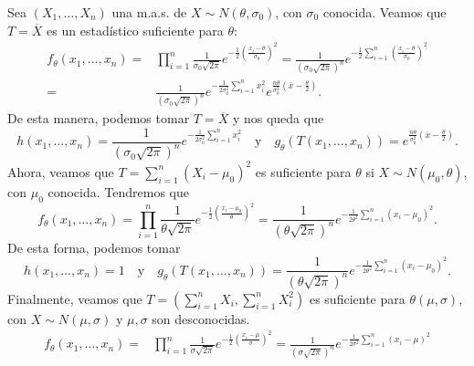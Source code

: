\begin{eg}[Normal]
	Sea $\displaystyle \left(X_{1}, \ldots, X_{n}\right) $ una m.a.s. de $\displaystyle X\sim N\left(\theta, \sigma_{0}\right) $, con $\displaystyle \sigma_{0} $ conocida. Veamos que $\displaystyle T=\overline{X} $ es un estadístico suficiente para $\displaystyle \theta $:
	\[
	\begin{split}
		f_{\theta}\left(x_{1}, \ldots, x_{n}\right)= & \prod^{n}_{i=1}\frac{1}{\sigma_{0}\sqrt{2\pi }}e^{-\frac{1}{2}\left(\frac{x_{i}-\theta}{\sigma_{0}}\right)^{2}}=\frac{1}{\left(\sigma_{0}\sqrt{2\pi }\right)^{n}} e^{-\frac{1}{2}\sum^{n}_{i=1}\left(\frac{x_{i}-\theta}{\sigma_{0}}\right)^{2}}\\
		= &\frac{1}{\left(\sigma_{0}\sqrt{2\pi }\right)^{n}} e^{-\frac{1}{2\sigma_{0}^{2}}\sum^{n}_{i=1}x_{i}^{2}}e^{\frac{n\theta}{\sigma_{0}^{2}}\left(\overline{x}-\frac{\theta}{2}\right)}.
	\end{split}
	\]
De esta manera, podemos tomar $\displaystyle T = \overline{X} $ y nos queda que
\[h\left(x_{1}, \ldots, x_{n}\right)=\frac{1}{\left(\sigma_{0}\sqrt{2\pi }\right)^{n}}e^{-\frac{1}{2\sigma_{0}^{2}}\sum^{n}_{i=1}x_{i}^{2}} \quad \text{y} \quad g_{\theta}\left(T\left(x_{1}, \ldots, x_{n}\right)\right)= e^{\frac{n\theta}{\sigma_{0}^{2}}\left(\overline{x}-\frac{\theta}{2}\right)}.\]
Ahora, veamos que $\displaystyle T = \sum^{n}_{i=1}\left(X_{i}-\mu_{0}\right)^{2} $ es suficiente para $\displaystyle \theta $ si $\displaystyle X \sim N\left(\mu_{0}, \theta\right) $, con $\displaystyle \mu_{0} $ conocida. Tendremos que
\[f_{\theta}\left(x_{1}, \ldots, x_{n}\right)=\prod^{n}_{i=1}\frac{1}{\theta\sqrt{2\pi }}e^{-\frac{1}{2}\left(\frac{x_{i}-\mu_{0}}{\theta}\right)^{2}}=\frac{1}{\left(\theta\sqrt{2\pi }\right)^{n}}e^{-\frac{1}{2\theta^{2}}\sum^{n}_{i=1}\left(x_{i}-\mu_{0}\right)^{2}} .\]
De esta forma, podemos tomar
\[h\left(x_{1}, \ldots, x_{n}\right)=1 \quad \text{y} \quad g_{\theta}\left(T\left(x_{1}, \ldots, x_{n}\right)\right)=\frac{1}{\left(\theta\sqrt{2\pi }\right)^{n}}e^{-\frac{1}{2\theta^{2}}\sum^{n}_{i=1}\left(x_{i}-\mu_{0}\right)^{2}}.\]
Finalmente, veamos que $\displaystyle T = \left(\sum^{n}_{i=1}X_{i}, \sum^{n}_{i=1}X^{2}_{i}\right) $ es suficiente para $\displaystyle \theta\left(\mu, \sigma \right) $, con $\displaystyle X \sim N\left(\mu, \sigma \right) $ y $\displaystyle \mu, \sigma  $ son desconocidas. 
\[
\begin{split}
	f_{\theta}\left(x_{1}, \ldots, x_{n}\right)=& \prod^{n}_{i=1}\frac{1}{\sigma\sqrt{2\pi }}e^{-\frac{1}{2}\left(\frac{x_{i}-\mu}{\sigma }\right)^{2}}=\frac{1}{\left(\sigma\sqrt{2\pi }\right)^{n}}e^{-\frac{1}{2\sigma^{2}}\sum^{n}_{i=1}\left(x_{i}-\mu\right)^{2}} \\

\end{split}\]
\end{eg}
